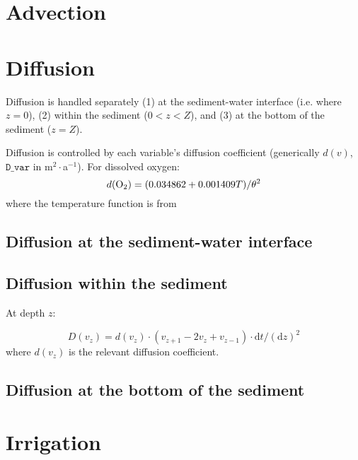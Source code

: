 \documentclass[a4paper]{article}
\newcommand{\D}[1]{\mathrm{d}#1}
\newcommand{\code}[1]{\texttt{#1}}
\begin{document}
\section{Advection}

\section{Diffusion}

Diffusion is handled separately (1) at the sediment-water interface (i.e. where $z = 0$), (2) within the sediment ($0 < z < Z$), and (3) at the bottom of the sediment ($z = Z$).

Diffusion is controlled by each variable's diffusion coefficient (generically $d(v)$, $\code{D\_var}$ in m$^2\cdot$a$^{-1}$). For dissolved oxygen:
\begin{equation}
d(\ce{O2}) = (0.034862 + 0.001409 T) / \theta^2
\end{equation}
where the temperature function is from 

\subsection{Diffusion at the sediment-water interface}



\subsection{Diffusion within the sediment}

At depth $z$:

\begin{equation}
D(v_z) = d(v_z) \cdot (v_{z+1} - 2 v_z + v_{z-1}) \cdot \D{t} / (\D{z})^2
\end{equation}
where $d(v_z)$ is the relevant diffusion coefficient.

\subsection{Diffusion at the bottom of the sediment}



\section{Irrigation}


\end{document}
